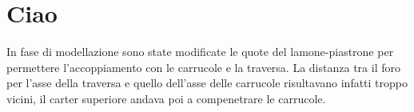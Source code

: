 \section{Ciao}
In fase di modellazione sono state modificate le quote del lamone-piastrone per permettere l'accoppiamento con le carrucole e la traversa. 
La distanza tra il foro per l'asse della traversa e quello dell'asse delle carrucole risultavano infatti troppo vicini, il carter superiore andava poi a compenetrare le carrucole.